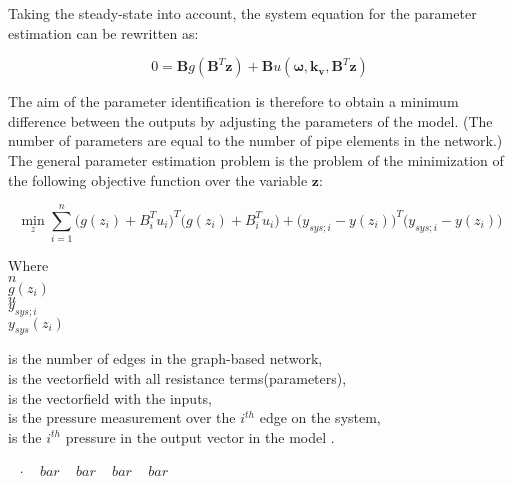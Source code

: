 Taking the steady-state into account, the system equation for the parameter estimation can be rewritten as: 

\begin{equation}
 0 = \pmb{B} g(\pmb{B}^T \pmb{z})+ \pmb{B} u(\pmb{\omega},\pmb{k_v}, \pmb{B}^T \pmb{z})
 \label{InputOutputmodel_steadystate}
\end{equation}

The aim of the parameter identification is therefore to obtain a minimum difference between the outputs by adjusting the parameters of the model. (The number of parameters are equal to the number of pipe elements in the network.) The general parameter estimation problem is the problem of the minimization of the following objective function over the variable $\pmb{z}$: 

%
%

 \begin{equation}
 \min_{z} \sum_{i=1}^{n}\Big(g(z_i) + B_i^Tu_i\Big)^T \Big(g(z_i)     + B_i^Tu_i\Big) + \big(y_{sys;i} - y(z_i)\big)^T  \big(y_{sys;i} - y(z_i)\big)
  \label{ObjectiveFunction}
 \end{equation}
 
\begin{minipage}[t]{0.20\textwidth}
Where\\
\hspace*{8mm} $n$ \\
\hspace*{8mm} $g(z_i)$ \\
\hspace*{8mm} $u$ \\
\hspace*{8mm} $y_{sys;i}$ \\
\hspace*{8mm} $y_{sys}(z_i)$ 
\end{minipage}
\begin{minipage}[t]{0.68\textwidth}
\vspace*{2mm}
is the number of edges in the graph-based network,\\
is the vectorfield with all resistance terms(parameters),\\
is the vectorfield with the inputs,\\
is the pressure measurement over the $i^{th}$ edge on the system,\\
is the $i^{th}$ pressure in the output vector in the model .
\end{minipage}
\begin{minipage}[t]{0.10\textwidth}
\vspace*{2mm}
\textcolor{White}{te}$\unit{\cdot}$
\textcolor{White}{te}$\unit{bar}$
\textcolor{White}{te}$\unit{bar}$
\textcolor{White}{te}$\unit{bar}$
\textcolor{White}{te}$\unit{bar}$
\end{minipage}

